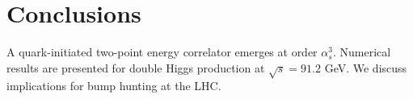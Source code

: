 \section{Conclusions}\label{sec:conclusions}

A quark-initiated two-point energy correlator emerges at order
$\alpha_s^3$. Numerical results are presented for double Higgs
production at $\sqrt{s} = 91.2$ GeV. We discuss implications for bump
hunting at the LHC.

